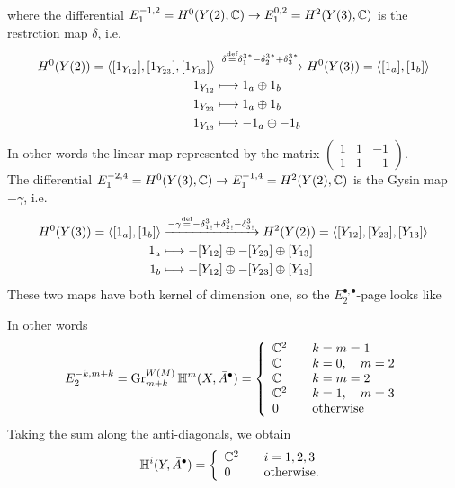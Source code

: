 \documentclass[../main.tex]{subfiles}
\begin{document}
where the differential $E_1^{-1,2}=H^0(Y(2),\mathbb{C}) \to E_1^{0,2}=H^2(Y(3),\mathbb{C})$ is the restrction map $\delta$, i.e.
\begin{align*}
    H^0(Y(2))=\langle [1_{Y_{12}}], [1_{Y_{23}}],[1_{Y_{13}}] \rangle &\xrightarrow{\delta \stackrel{\text{def}}{=} {\delta_1^3}^*-{\delta_2^3}^* +{\delta_3^3}^*} H^0(Y(3))=\langle [1_a], [1_b] \rangle \\
    1_{Y_{12}} &\longmapsto 1_a \oplus 1_b \\
     1_{Y_{23}} &\longmapsto 1_a \oplus 1_b \\
      1_{Y_{13}} &\longmapsto -1_a \oplus -1_b 
\end{align*}
In other words the linear map represented by the matrix
$\begin{pmatrix}
1  & 1 & -1 \\
1  & 1 & -1 
\end{pmatrix}$. \\
The differential $E_1^{-2,4}=H^0(Y(3),\mathbb{C}) \to E_1^{-1,4}=H^2(Y(2),\mathbb{C})$ is the Gysin map $-\gamma$, i.e.
\begin{align*}
    H^0(Y(3))=\langle [1_a], [1_b] \rangle &\xrightarrow{-\gamma \stackrel{\text{def}}{=} -{\delta_1^3}_! + {\delta_2^3}_! -  {\delta_3^3}_!  } H^2(Y(2))=\langle [{Y_{12}}], [{Y_{23}}],[{Y_{13}}]\rangle \\
    1_a &\longmapsto  - [{Y_{12}}] \oplus - [{Y_{23}}] \oplus [{Y_{13}}] \\
    1_b &\longmapsto  - [{Y_{12}}] \oplus - [{Y_{23}}] \oplus [{Y_{13}}]
\end{align*}
These two maps have both kernel of dimension one,
so the $E_2^{\bullet,\bullet}$-page looks like 
\begin{center}
\end{center}
In other words 
\[
 {E_2^{-k,m+k}}= \operatorname{Gr}^{W(M)}_{m+k} \mathbb{H}^m(X,\bar A^\bullet)=
    \left\{\begin{array}{ll} 
 \mathbb{C}^2 &\quad k = m = 1 \\ 
 \mathbb{C} &\quad k = 0, \quad m = 2 \\
  \mathbb{C} &\quad k = m = 2 \\
  \mathbb{C}^2 &\quad k =1, \quad m = 3 \\
0 &\quad \text{otherwise}  \end{array}\right.
\]
Taking the sum along the anti-diagonals, we obtain
\[
\mathbb{H}^i(Y, \bar A^\bullet)= \left\{\begin{array}{ll} 
 \mathbb{C}^2 &\quad i = 1,2,3 \\ 
0 &\quad \text{otherwise} . \end{array}\right.
\]
\end{document}
